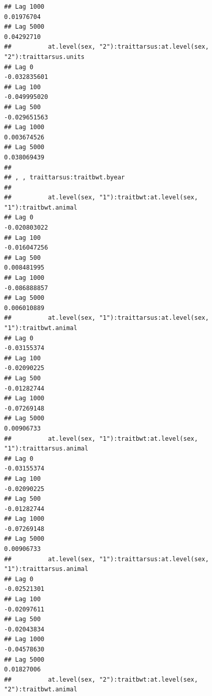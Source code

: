 \documentclass[
  12pt,
]{book}
\begin{document}
\begin{verbatim}
## Lag 1000                                                       0.01976704
## Lag 5000                                                       0.04292710
##          at.level(sex, "2"):traittarsus:at.level(sex, "2"):traittarsus.units
## Lag 0                                                           -0.032835601
## Lag 100                                                         -0.049995020
## Lag 500                                                         -0.029651563
## Lag 1000                                                         0.003674526
## Lag 5000                                                         0.038069439
## 
## , , traittarsus:traitbwt.byear
## 
##          at.level(sex, "1"):traitbwt:at.level(sex, "1"):traitbwt.animal
## Lag 0                                                      -0.020803022
## Lag 100                                                    -0.016047256
## Lag 500                                                     0.008481995
## Lag 1000                                                   -0.086888857
## Lag 5000                                                    0.006010889
##          at.level(sex, "1"):traittarsus:at.level(sex, "1"):traitbwt.animal
## Lag 0                                                          -0.03155374
## Lag 100                                                        -0.02090225
## Lag 500                                                        -0.01282744
## Lag 1000                                                       -0.07269148
## Lag 5000                                                        0.00906733
##          at.level(sex, "1"):traitbwt:at.level(sex, "1"):traittarsus.animal
## Lag 0                                                          -0.03155374
## Lag 100                                                        -0.02090225
## Lag 500                                                        -0.01282744
## Lag 1000                                                       -0.07269148
## Lag 5000                                                        0.00906733
##          at.level(sex, "1"):traittarsus:at.level(sex, "1"):traittarsus.animal
## Lag 0                                                             -0.02521301
## Lag 100                                                           -0.02097611
## Lag 500                                                           -0.02043834
## Lag 1000                                                          -0.04578630
## Lag 5000                                                           0.01827006
##          at.level(sex, "2"):traitbwt:at.level(sex, "2"):traitbwt.animal

\end{verbatim}
\end{document}
